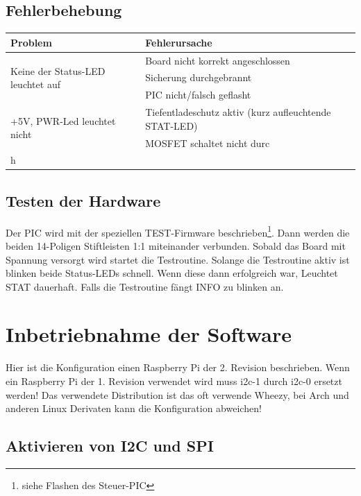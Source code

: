 \documentclass[a4paper,10pt]{article}
\begin{document}
\subsection{Fehlerbehebung}

\begin{center}
    \begin{tabular}{| l | p{6cm} |}
    \hline
    Problem 							& Fehlerursache \\ \hline
    \multirow{3}{*}{Keine der Status-LED leuchtet auf}
	& Board nicht korrekt angeschlossen \\ \cline{2-2}
	& Sicherung durchgebrannt \\ \cline{2-2}
	& PIC nicht/falsch geflasht \\
    \hline
    \multirow{2}{*}{+5V, PWR-Led leuchtet nicht}
	& Tiefentladeschutz aktiv (kurz aufleuchtende STAT-LED) \\ \cline{2-2}
	& MOSFET schaltet nicht durc\mbox{} \\h \\
    \hline
    \end{tabular}
\end{center}

\subsection{Testen der Hardware}

Der PIC wird mit der speziellen TEST-Firmware beschrieben\footnote{siehe Flashen des Steuer-PIC}. Dann werden die beiden 14-Poligen Stiftleisten 1:1 miteinander verbunden. Sobald das Board mit Spannung versorgt wird startet die Testroutine. Solange die Testroutine aktiv ist blinken beide Status-LEDs schnell. Wenn diese dann erfolgreich war, Leuchtet STAT dauerhaft. Falls die Testroutine fängt INFO zu blinken an.

\newpage

\section{Inbetriebnahme der Software}

Hier ist die Konfiguration einen Raspberry Pi der 2. Revision beschrieben. Wenn ein Raspberry Pi der 1. Revision verwendet wird muss i2c-1 durch i2c-0 ersetzt werden! Das verwendete Distribution ist das oft verwende Wheezy, bei Arch und anderen Linux Derivaten kann die Konfiguration abweichen!

\subsection{Aktivieren von I2C und SPI}
\end{document}
